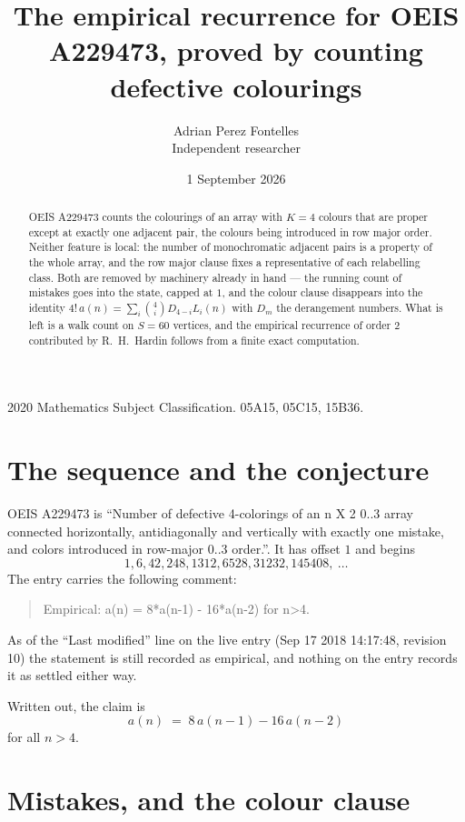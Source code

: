 \documentclass[11pt,a4paper]{article}
\title{The empirical recurrence for OEIS A229473, proved by counting defective colourings}
\author{Adrian Perez Fontelles\\ \small Independent researcher}
\date{1 September 2026}
\theoremstyle{plain}
\theoremstyle{definition}
\begin{document}
\maketitle

\begin{abstract}
OEIS A229473 counts the colourings of an array with $K=4$ colours that are proper except at
exactly one adjacent pair, the colours being introduced in row
major order. Neither feature is local: the number of monochromatic adjacent pairs is a
property of the whole array, and the row major clause fixes a representative of each
relabelling class. Both are removed by machinery already in hand --- the running count of
mistakes goes into the state, capped at $1$, and the colour clause disappears into the
identity $4!\,a(n)=\sum_i\binom{4}{i}D_{4-i}L_i(n)$ with $D_m$ the derangement
numbers. What is left is a walk count on $S=60$ vertices, and the empirical recurrence of
order $2$ contributed by R.~H.~Hardin follows from a finite exact computation.
\end{abstract}

\noindent\small 2020 Mathematics Subject Classification. 05A15, 05C15, 15B36.\normalsize

\section{The sequence and the conjecture}

OEIS A229473 is ``Number of defective 4-colorings of an n X 2 0..3 array connected horizontally, antidiagonally and vertically with exactly one mistake, and colors introduced in row-major 0..3 order.''. It has offset $1$ and begins
\[
1, 6, 42, 248, 1312, 6528, 31232, 145408,\ \dots
\]
The entry carries the following comment:
\begin{quote}\small
Empirical: a(n) = 8*a(n-1) - 16*a(n-2) for n>4.
\end{quote}
As of the ``Last modified'' line on the live entry (Sep 17 2018 14:17:48, revision 10) the statement is
still recorded as empirical, and nothing on the entry records it as settled either way.

Written out, the claim is
\begin{equation}\label{eq:conj}
a(n)\;=\;8\,a(n-1) - 16\,a(n-2)
\end{equation}
for all $n>4$.

\section{Mistakes, and the colour clause}
\end{document}
